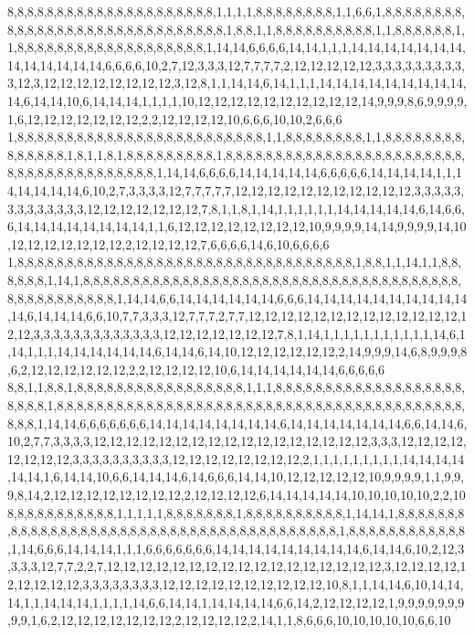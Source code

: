 8,8,8,8,8,8,8,8,8,8,8,8,8,8,8,8,8,8,8,8,8,1,1,1,1,8,8,8,8,8,8,8,8,1,1,6,6,1,8,8,8,8,8,8,8,8,8,8,8,8,8,8,8,8,8,8,8,8,8,8,8,8,8,8,8,8,8,8,1,8,8,1,1,8,8,8,8,8,8,8,8,8,8,1,1,8,8,8,8,8,8,1,1,8,8,8,8,8,8,8,8,8,8,8,8,8,8,8,8,8,8,8,1,14,14,6,6,6,6,14,14,1,1,1,14,14,14,14,14,14,14,14,14,14,14,14,14,6,6,6,6,10,2,7,12,3,3,3,12,7,7,7,7,2,12,12,12,12,12,3,3,3,3,3,3,3,3,3,3,12,3,12,12,12,12,12,12,12,12,3,12,8,1,1,14,14,6,14,1,1,1,14,14,14,14,14,14,14,14,14,14,6,14,14,10,6,14,14,14,1,1,1,1,10,12,12,12,12,12,12,12,12,12,12,14,9,9,9,8,6,9,9,9,9,1,6,12,12,12,12,12,12,12,2,2,12,12,12,12,10,6,6,6,10,10,2,6,6,6
1,8,8,8,8,8,8,8,8,8,8,8,8,8,8,8,8,8,8,8,8,8,8,8,8,8,1,1,8,8,8,8,8,8,8,8,1,1,8,8,8,8,8,8,8,8,8,8,8,8,8,8,1,8,1,1,8,1,8,8,8,8,8,8,8,8,8,1,8,8,8,8,8,8,8,8,8,8,8,8,8,8,8,8,8,8,8,8,8,8,8,8,8,8,8,8,8,8,8,8,8,8,8,8,8,8,8,1,14,14,6,6,6,6,14,14,14,14,14,6,6,6,6,6,14,14,14,14,1,1,14,14,14,14,14,6,10,2,7,3,3,3,3,12,7,7,7,7,7,12,12,12,12,12,12,12,12,12,12,12,3,3,3,3,3,3,3,3,3,3,3,3,3,12,12,12,12,12,12,12,7,8,1,1,8,1,14,1,1,1,1,1,1,14,14,14,14,14,6,14,6,6,6,14,14,14,14,14,14,14,14,1,1,6,12,12,12,12,12,12,12,12,10,9,9,9,9,14,14,9,9,9,9,14,10,12,12,12,12,12,12,12,2,12,12,12,12,7,6,6,6,6,14,6,10,6,6,6,6
1,8,8,8,8,8,8,8,8,8,8,8,8,8,8,8,8,8,8,8,8,8,8,8,8,8,8,8,8,8,8,8,8,8,8,1,8,8,1,1,14,1,1,8,8,8,8,8,8,1,14,1,8,8,8,8,8,8,8,8,8,8,8,8,8,8,8,8,8,8,8,8,8,8,8,8,8,8,8,8,8,8,8,8,8,8,8,8,8,8,8,8,8,8,8,8,8,8,8,8,8,1,14,14,6,6,14,14,14,14,14,14,6,6,6,14,14,14,14,14,14,14,14,14,14,14,6,14,14,14,6,6,10,7,7,3,3,3,12,7,7,7,2,7,7,12,12,12,12,12,12,12,12,12,12,12,12,12,12,12,3,3,3,3,3,3,3,3,3,3,3,3,3,12,12,12,12,12,12,12,7,8,1,14,1,1,1,1,1,1,1,1,1,1,1,14,6,1,14,1,1,1,14,14,14,14,14,14,6,14,14,6,14,10,12,12,12,12,12,12,2,14,9,9,9,14,6,8,9,9,9,8,6,2,12,12,12,12,12,12,2,2,12,12,12,12,10,6,14,14,14,14,14,14,6,6,6,6,6
8,8,1,1,8,8,1,8,8,8,8,8,8,8,8,8,8,8,8,8,8,8,8,8,1,1,1,8,8,8,8,8,8,8,8,8,8,8,8,8,8,8,8,8,8,8,8,8,8,8,1,8,8,8,8,8,8,8,8,8,8,8,8,8,8,8,8,8,8,8,8,8,8,8,8,8,8,8,8,8,8,8,8,8,8,8,8,8,8,8,8,8,8,8,8,1,14,14,6,6,6,6,6,6,6,14,14,14,14,14,14,14,14,6,14,14,14,14,14,14,14,6,6,14,14,6,10,2,7,7,3,3,3,3,12,12,12,12,12,12,12,12,12,12,12,12,12,12,12,12,12,3,3,3,12,12,12,12,12,12,12,12,3,3,3,3,3,3,3,3,3,3,12,12,12,12,12,12,12,12,2,1,1,1,1,1,1,1,1,1,14,14,14,14,14,14,1,6,14,14,10,6,6,14,14,14,6,14,6,6,6,14,14,10,12,12,12,12,12,10,9,9,9,9,1,1,9,9,9,8,14,2,12,12,12,12,12,12,12,12,2,12,12,12,12,6,14,14,14,14,14,10,10,10,10,10,2,2,10
8,8,8,8,8,8,8,8,8,8,8,1,1,1,1,1,8,8,8,8,8,8,8,1,8,8,8,8,8,8,8,8,8,8,1,14,14,1,8,8,8,8,8,8,8,8,8,8,8,8,8,8,8,8,8,8,8,8,8,8,8,8,8,8,8,8,8,8,8,8,8,8,8,8,8,8,8,8,1,8,8,8,8,8,8,8,8,8,8,8,8,1,14,6,6,6,14,14,14,1,1,1,6,6,6,6,6,6,6,14,14,14,14,14,14,14,14,14,6,14,14,6,10,2,12,3,3,3,3,12,7,7,2,2,7,12,12,12,12,12,12,12,12,12,12,12,12,12,12,12,12,12,3,12,12,12,12,12,12,12,12,12,3,3,3,3,3,3,3,3,12,12,12,12,12,12,12,12,12,12,10,8,1,1,14,14,6,10,14,14,14,1,1,14,14,14,1,1,1,1,14,6,6,14,14,1,14,14,14,14,6,6,14,2,12,12,12,12,1,9,9,9,9,9,9,9,9,9,1,6,2,12,12,12,12,12,12,12,2,12,12,12,12,2,14,1,1,8,6,6,6,10,10,10,10,10,6,6,10
